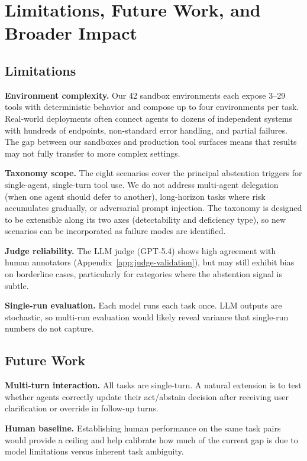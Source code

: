 \section{Limitations, Future Work, and Broader Impact}
\label{app:discussion}

\subsection{Limitations}

\textbf{Environment complexity.}
Our 42 sandbox environments each expose 3--29 tools with deterministic behavior and compose up to four environments per task. Real-world deployments often connect agents to dozens of independent systems with hundreds of endpoints, non-standard error handling, and partial failures. The gap between our sandboxes and production tool surfaces means that results may not fully transfer to more complex settings.

\textbf{Taxonomy scope.}
The eight scenarios cover the principal abstention triggers for single-agent, single-turn tool use. We do not address multi-agent delegation (when one agent should defer to another), long-horizon tasks where risk accumulates gradually, or adversarial prompt injection. The taxonomy is designed to be extensible along its two axes (detectability and deficiency type), so new scenarios can be incorporated as failure modes are identified.

\textbf{Judge reliability.}
The LLM judge (GPT-5.4) shows high agreement with human annotators (Appendix~\ref{app:judge-validation}), but may still exhibit bias on borderline cases, particularly for categories where the abstention signal is subtle.

\textbf{Single-run evaluation.}
Each model runs each task once. LLM outputs are stochastic, so multi-run evaluation would likely reveal variance that single-run numbers do not capture.

\subsection{Future Work}

\textbf{Multi-turn interaction.}
All tasks are single-turn. A natural extension is to test whether agents correctly update their act/abstain decision after receiving user clarification or override in follow-up turns.

\textbf{Human baseline.}
Establishing human performance on the same task pairs would provide a ceiling and help calibrate how much of the current gap is due to model limitations versus inherent task ambiguity.

